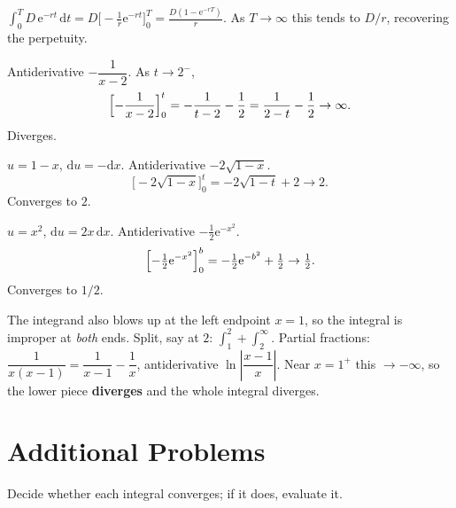 \begin{solutions}
  \item $\displaystyle\int_{0}^{T} D\,\mathrm{e}^{-rt}\,\mathrm{d}t
        =D\bigl[-\tfrac{1}{r}\mathrm{e}^{-rt}\bigr]_{0}^{T}
        =\frac{D(1-\mathrm{e}^{-rT})}{r}$. As $T\to\infty$ this tends
        to $D/r$, recovering the perpetuity.

  \item Antiderivative $-\dfrac{1}{x-2}$. As $t\to 2^{-}$,
        \[
          \Bigl[-\frac{1}{x-2}\Bigr]_{0}^{t}
            =-\frac{1}{t-2}-\frac{1}{2}=\frac{1}{2-t}-\frac{1}{2}\to\infty .
        \]
        Diverges.

  \item $u=1-x$, $\mathrm{d}u=-\mathrm{d}x$. Antiderivative
        $-2\sqrt{1-x}$.
        \[
          \bigl[-2\sqrt{1-x}\bigr]_{0}^{t}=-2\sqrt{1-t}+2\to 2 .
        \]
        Converges to $2$.

  \item $u=x^{2}$, $\mathrm{d}u=2x\,\mathrm{d}x$. Antiderivative
        $-\tfrac12\mathrm{e}^{-x^{2}}$.
        \[
          \Bigl[-\tfrac12\mathrm{e}^{-x^{2}}\Bigr]_{0}^{b}
            =-\tfrac12\mathrm{e}^{-b^{2}}+\tfrac12\to\tfrac12 .
        \]
        Converges to $1/2$.

  \item The integrand also blows up at the left endpoint $x=1$, so the
        integral is improper at \emph{both} ends. Split, say at $2$:
        $\int_{1}^{2}+\int_{2}^{\infty}$. Partial fractions:
        $\dfrac{1}{x(x-1)}=\dfrac{1}{x-1}-\dfrac{1}{x}$, antiderivative
        $\ln\left|\dfrac{x-1}{x}\right|$. Near $x=1^{+}$ this
        $\to-\infty$, so the lower piece \textbf{diverges} and the
        whole integral diverges.
\end{solutions}

\section{Additional Problems}

Decide whether each integral converges; if it does, evaluate it.

